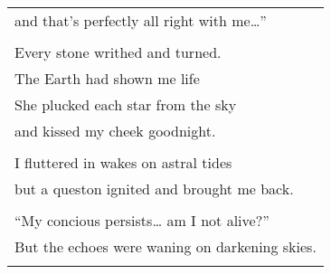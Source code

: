 \documentclass{article}
\begin{document}
\begin{center}
\begin{tabular}{l}
and that's perfectly all right with me\ldots{}'' \\
\\
Every stone writhed and turned. \\
The Earth had shown me life \\
She plucked each star from the sky \\
and kissed my cheek goodnight. \\
\\
I fluttered in wakes on astral tides \\
but a queston ignited and brought me back. \\
\\
``My concious persists\ldots{} am I not alive?'' \\
But the echoes were waning on darkening skies. \\
\\
\end{tabular}
\end{center}

\begin{center}
\begin{tabular}{l} %
%
\end{tabular}
\end{center}
\end{document}
